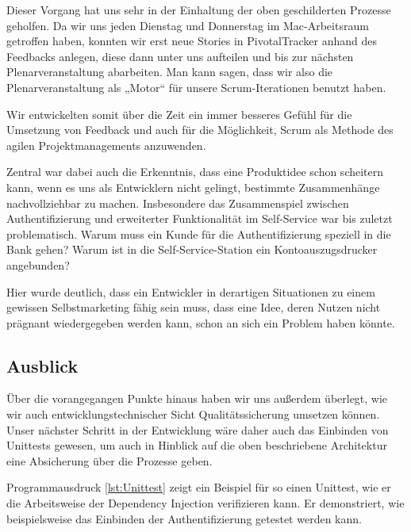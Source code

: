 	Dieser Vorgang hat uns sehr in der Einhaltung der oben geschilderten Prozesse geholfen. Da wir uns jeden Dienstag und Donnerstag im Mac-Arbeitsraum getroffen haben, konnten wir erst neue Stories in PivotalTracker anhand des Feedbacks anlegen, diese dann unter uns aufteilen und bis zur nächsten Plenarveranstaltung abarbeiten. Man kann sagen, dass wir also die Plenarveranstaltung als „Motor“ für unsere Scrum-Iterationen benutzt haben.
	
	Wir entwickelten somit über die Zeit ein immer besseres Gefühl für die Umsetzung von Feedback und auch für die Möglichkeit, Scrum als Methode des agilen Projektmanagements anzuwenden. 
	
	Zentral war dabei auch die Erkenntnis, dass eine Produktidee schon scheitern kann, wenn es uns als Entwicklern nicht gelingt, bestimmte Zusammenhänge nachvollziehbar zu machen. Insbesondere das Zusammenspiel zwischen Authentifizierung und erweiterter Funktionalität im Self-Service war bis zuletzt problematisch. Warum muss ein Kunde für die Authentifizierung speziell in die Bank gehen? Warum ist in die Self-Service-Station ein Kontoauszugsdrucker angebunden? 
	
	Hier wurde deutlich, dass ein Entwickler in derartigen Situationen zu einem gewissen Selbstmarketing fähig sein muss, dass eine Idee, deren Nutzen nicht prägnant wiedergegeben werden kann, schon an sich ein Problem haben könnte.

\subsection{Ausblick}
	Über die vorangegangen Punkte hinaus haben wir uns außerdem überlegt, wie wir auch entwicklungstechnischer Sicht Qualitätssicherung umsetzen können. Unser nächster Schritt in der Entwicklung wäre daher auch das Einbinden von Unittests gewesen, um auch in Hinblick auf die oben beschriebene Architektur eine Absicherung über die Prozesse geben.
	
	Programmausdruck \ref{lst:Unittest} zeigt ein Beispiel für so einen Unittest, wie er die Arbeitsweise der Dependency Injection verifizieren kann. Er demonstriert, wie beispielsweise das Einbinden der Authentifizierung getestet werden kann.
	
	